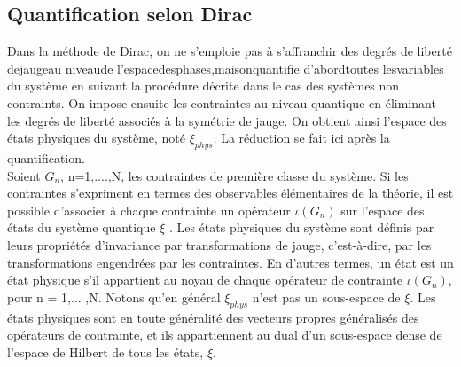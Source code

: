 \documentclass[12pt,a4paper, openany]{article}
\begin{document}
\subsection{Quantification selon Dirac}

\hspace{0.5cm}Dans la méthode de Dirac, on ne s’emploie pas à s’aﬀranchir des degrés de liberté dejaugeau niveaude l’espacedesphases,maisonquantiﬁe d’abordtoutes lesvariables du système en suivant la procédure décrite dans le cas des systèmes non contraints. On impose ensuite les contraintes au niveau quantique en éliminant les degrés de liberté associés à la symétrie de jauge. On obtient ainsi l’espace des états physiques du système, noté $\xi_{phys}$. La réduction se fait ici après la quantiﬁcation.\\ 

\hspace{0.5cm} Soient $ G_n $, n=1,....,N, les contraintes de première classe du système. Si les contraintes s’expriment en termes des observables élémentaires de la théorie, il est possible d’associer à chaque contrainte un opérateur $\iota(G_n) $ sur l’espace des états du système quantique $\xi$ . Les états physiques du système sont déﬁnis par leurs propriétés d’invariance par transformations de jauge, c’est-à-dire, par les transformations engendrées par les contraintes. En d’autres termes, un état est un état physique s’il appartient au noyau de chaque opérateur de contrainte $\iota(G_n) $, pour n = 1,... ,N. Notons qu’en général $\xi_{phys}$ n’est pas un sous-espace de $\xi$. Les états physiques sont en toute généralité des vecteurs propres généralisés des opérateurs de contrainte, et ils appartiennent au dual d’un sous-espace dense de l’espace de Hilbert de tous les états, $\xi$.\\
\end{document}
